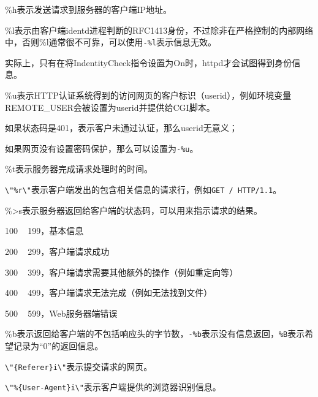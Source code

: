 \begin{compactitem}
\item \%h表示发送请求到服务器的客户端IP地址。
\item \%l表示由客户端identd进程判断的RFC1413身份，不过除非在严格控制的内部网络中，否则\%l通常很不可靠，可以使用\texttt{-\%l}表示信息无效。

实际上，只有在将IndentityCheck指令设置为On时，httpd才会试图得到身份信息。

\item \%u表示HTTP认证系统得到的访问网页的客户标识（userid），例如环境变量REMOTE\_USER会被设置为userid并提供给CGI脚本。

\begin{compactitem}[$\circ$]
\item 如果状态码是401，表示客户未通过认证，那么userid无意义；
\item 如果网页没有设置密码保护，那么可以设置为\texttt{-\%u}。
\end{compactitem}

\item \%t表示服务器完成请求处理时的时间。

\item \texttt{\textbackslash "\%r\textbackslash"}表示客户端发出的包含相关信息的请求行，例如\texttt{GET / HTTP/1.1}。

\item \%>s表示服务器返回给客户端的状态码，可以用来指示请求的结果。

\begin{compactitem}[$\circ$]
\item 100 ~ 199，基本信息
\item 200 ~ 299，客户端请求成功
\item 300 ~ 399，客户端请求需要其他额外的操作（例如重定向等）
\item 400 ~ 499，客户端请求无法完成（例如无法找到文件）
\item 500 ~ 599，Web服务器端错误
\end{compactitem}

\item \%b表示返回给客户端的不包括响应头的字节数，\texttt{-\%b}表示没有信息返回，\texttt{\%B}表示希望记录为“0”的返回信息。

\item \texttt{\textbackslash "\{Referer\}i\textbackslash "}表示提交请求的网页。

\item \texttt{\textbackslash "\%\{User-Agent\}i\textbackslash "}表示客户端提供的浏览器识别信息。

\end{compactitem}

